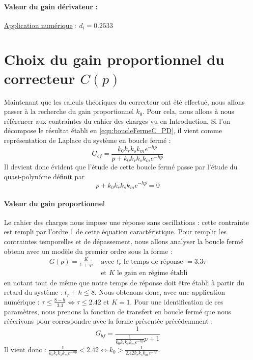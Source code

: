 \paragraph*{Valeur du gain dérivateur : }\underline{Application numérique} : $d_i = 0.2533$
\section{Choix du gain proportionnel du correcteur $C(p)$}
Maintenant que les calculs théoriques du correcteur ont été effectué, nous allons passer à la recherche du gain proportionnel $k_0$. Pour cela, nous allons à nous référencer aux contraintes du cahier des charges vu en Introduction. Si l'on décompose le résultat établi en \ref{eqn:boucleFermeC_PD}, il vient comme représentation de Laplace du système en boucle fermé :
\begin{equation}\label{eqn:boucleFermeC_PD_detaillé}
G_{bf} = \frac{k_0k_rk_sk_me^{-hp}}{p+k_0k_rk_sk_me^{-hp}}
\end{equation}
Il devient donc évident que l'étude de cette boucle fermé passe par l'étude du quasi-polynôme définit par \begin{equation}\label{eqn:quasipolynome_CPD}
p+k_0k_rk_sk_me^{-hp}=0
\end{equation}

\paragraph*{Valeur du gain proportionnel}
Le cahier des charges nous impose une réponse sans oscillations : cette contrainte est rempli par l'ordre 1 de cette équation caractéristique. Pour remplir les contraintes temporelles et de dépassement, nous allons analyser la boucle fermé obtenu avec un modèle du premier ordre sous la forme : 
\begin{align*}
G(p) = \frac{K}{1+\tau p} &\text{ avec }t_r \text{ le temps de réponse } = 3.3\tau \\& \text{ et } K \text{ le gain en régime établi} 
\end{align*}
en notant tout de même que notre temps de réponse doit être établi à partir du retard du système : $t_r + h \leq 8$. Nous obtenons donc, avec une application numérique : $\tau \leq \frac{8-h}{3.3} \Leftrightarrow \tau \leq 2.42$ et $K=1$. 
Pour une identification de ces paramètres, nous prenons la fonction de transfert en boucle fermé que nous réécrivons pour correspondre avec la forme présentée précédemment : 
\begin{equation}
G_{bf} = \frac{1}{\frac{1}{k_0k_rk_sk_me^{-hp}}p+1}
\end{equation} 
Il vient donc : $\frac{1}{k_0k_rk_sk_me^{-hp}} < 2.42 \Leftrightarrow k_0 > \frac{1}{2.42k_rk_sk_me^{-hp}}$. 

